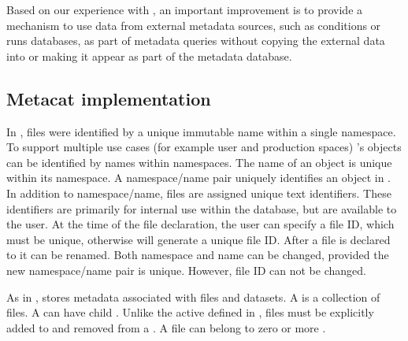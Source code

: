 \documentclass[../main-v1.tex]{subfiles}
\begin{document}
Based on our experience with , an important improvement is to provide a mechanism to use data from external metadata sources, such as conditions or runs databases, as part of metadata queries without copying the external data into or making it appear as part of the metadata database. 



\subsection{Metacat implementation} 

In , files were identified by a unique immutable name within a single namespace.  To support  multiple use cases (for example user and production spaces) 's objects %
can be identified  by names within namespaces. The name of an object is unique within its namespace. A namespace/name pair uniquely identifies  an object in . In addition to namespace/name, files are assigned unique text identifiers. These identifiers are primarily for internal use within the  database, but are available to the user. At the time of the file declaration, the user can specify a file ID, which must be unique, otherwise  will generate a unique file ID. After a file is declared to  it can be renamed. Both namespace and name can be changed, provided the new namespace/name pair is unique. However, file ID can not be changed. 

As in ,  stores metadata associated with files and datasets. %
A  is a collection of files. A  can have child .  %
Unlike the active  defined   in , files must be explicitly added to and removed from a . 
A file can belong to zero or more . 
\end{document}
